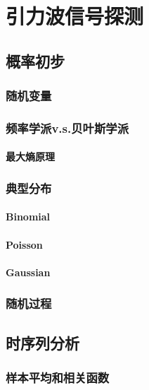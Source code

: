 
\chapter{引力波信号探测}
\label{chap6}

\section{概率初步}
\subsection{随机变量}
\subsection{频率学派v.s.贝叶斯学派}
\subsubsection{最大熵原理}
\subsection{典型分布}
\subsubsection{Binomial}
\subsubsection{Poisson}
\subsubsection{Gaussian}
\subsection{随机过程}

\section{时序列分析}
\subsection{样本平均和相关函数}
